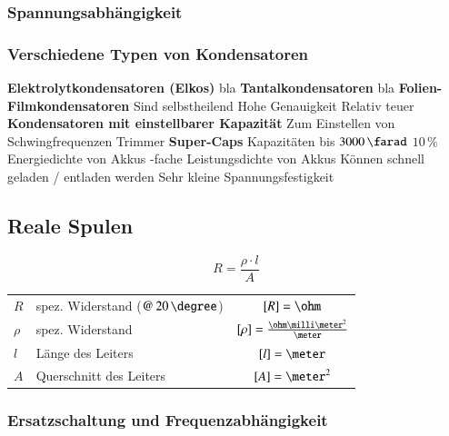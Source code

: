 \subsubsection{Spannungsabhängigkeit}



\subsubsection{Verschiedene Typen von Kondensatoren}

\begin{outline}
    \1 \textbf{Elektrolytkondensatoren (Elkos)}
        \2 bla
    \1 \textbf{Tantalkondensatoren}
        \2 bla
    \1 \textbf{Folien-Filmkondensatoren}
        \2 Sind selbstheilend 
        \2 Hohe Genauigkeit
        \2 Relativ teuer
    \1 \textbf{Kondensatoren mit einstellbarer Kapazität}
        \2 Zum Einstellen von Schwingfrequenzen
        \2 Trimmer
    \1 \textbf{Super-Caps}
        \2 Kapazitäten bis $3000 \, \farad$
        \2 $10 \, \%$ Energiedichte von Akkus
        -fache Leistungsdichte von Akkus
        \2 Können schnell geladen / entladen werden
        \2 Sehr kleine Spannungsfestigkeit
\end{outline}


\subsection{Reale Spulen}

\begin{minipage}[c]{0.20\columnwidth}
    
    $$ \boxed{R = \frac{\rho \cdot l}{A}} $$
\end{minipage}
\hfill
\begin{minipage}[c]{0.78\columnwidth}
    \begin{tabular}{llc}
        $R$     & spez. Widerstand ($@ \, 20 \, \degree$)   & $[R] = \ohm$ \\
        $\rho$  & spez. Widerstand                          & $[\rho] = \frac{\ohm \milli \meter^2}{\meter}$ \\
        $l$     & Länge des Leiters                         & $[l] = \meter$ \\
        $A$     & Querschnitt des Leiters                   & $[A] = \meter^2$
    \end{tabular}
\end{minipage}


\subsubsection{Ersatzschaltung und Frequenzabhängigkeit}

